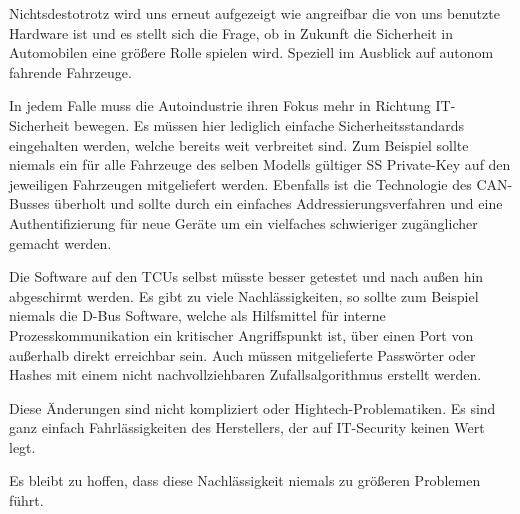 \documentclass[
    fontsize=12pt,
    headings=small,
    parskip=half,           %
    bibliography=totoc,9
    numbers=noenddot,       %
    open=any,               %
    ]{scrreprt}
\begin{document}
Nichtsdestotrotz wird uns erneut aufgezeigt wie angreifbar die von uns benutzte Hardware ist und es stellt sich die Frage, ob in Zukunft die Sicherheit in Automobilen eine größere Rolle spielen wird. Speziell im Ausblick auf autonom fahrende Fahrzeuge.

In jedem Falle muss die Autoindustrie ihren Fokus mehr in Richtung IT-Sicherheit bewegen. Es müssen hier lediglich einfache Sicherheitsstandards eingehalten werden, welche bereits weit verbreitet sind. Zum Beispiel sollte niemals ein für alle Fahrzeuge des selben Modells gültiger SS Private-Key auf den jeweiligen Fahrzeugen mitgeliefert werden. Ebenfalls ist die Technologie des CAN-Busses überholt und sollte durch ein einfaches Addressierungsverfahren und eine Authentifizierung für neue Geräte um ein vielfaches schwieriger zugänglicher gemacht werden.

Die Software auf den TCUs selbst müsste besser getestet und nach außen hin abgeschirmt werden. Es gibt zu viele Nachlässigkeiten, so sollte zum Beispiel niemals die D-Bus Software, welche als Hilfsmittel für interne Prozesskommunikation ein kritischer Angriffspunkt ist, über einen Port von außerhalb direkt erreichbar sein.
Auch müssen mitgelieferte Passwörter oder Hashes mit einem nicht nachvollziehbaren Zufallsalgorithmus erstellt werden.

Diese Änderungen sind nicht kompliziert oder Hightech-Problematiken. Es sind ganz einfach Fahrlässigkeiten des Herstellers, der auf IT-Security keinen Wert legt.

Es bleibt zu hoffen, dass diese Nachlässigkeit niemals zu größeren Problemen führt.


\nocite{*}


\end{document}
